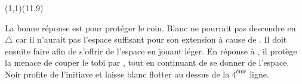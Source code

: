 \documentclass[preview, border=0pt, varwidth=false]{standalone}
\begin{document}
	\setgounit{0.6cm} 
	
\parbox[c][14.65cm][c]{10.2cm}{
	\centering
	
	\begin{psgopartialboard}{(1,1)(11,9)}
		\pass
	\end{psgopartialboard}
	
	\vspace{1em}
	
	La bonne réponse est  pour protéger le coin. Blanc ne pourrait pas descendre en $\triangle$ car il n'aurait pas l'espace suffisant pour son extension à cause de .
	Il doit ensuite faire  afin de s'offrir de l'espace en jouant léger. En réponse à , il protège la menace de couper le tobi par , tout en continuant de se donner de l'espace.
	Noir profite de l'initiave et laisse blanc flotter au dessus de la $4^\text{ème}$ ligne.
}
\end{document}
